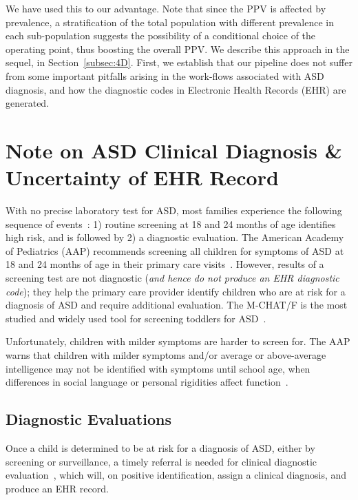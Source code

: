 \documentclass[onecolumn,,10pt]{IEEEtran}
\begin{document}
We have used this to our advantage. Note that since the PPV is affected by prevalence,  a stratification of the total population with different prevalence in each sub-population suggests the possibility of a conditional choice of the operating point, thus boosting the overall PPV. We describe this approach in the sequel, in Section~\ref{subsec:4D}. First, we establish that our pipeline does not suffer from some important pitfalls arising in the work-flows associated with ASD diagnosis, and how the diagnostic codes in Electronic Health Records (EHR) are generated.
%
\section{Note on ASD Clinical Diagnosis \& Uncertainty of EHR Record}\label{sec:diag}
With no precise laboratory  test for ASD, most families experience the following sequence of events~\cite{gordon2016whittling,penner2018practice,hyman2020identification}: 1) routine screening at 18 and 24 months of age  identifies high risk, and   is followed by 2) a diagnostic evaluation. The American Academy of Pediatrics (AAP)  recommends screening all
children for symptoms of ASD
 at 18 and
24 months of age in their primary
care visits~\cite{johnson2007identification,zwaigenbaum2015early}.  However, results of a screening test are not
diagnostic (\textit{and hence do not produce an EHR diagnostic code}); they help the primary care
provider identify children who are at
risk for a diagnosis of ASD and
require additional evaluation. The M-CHAT/F is the
most studied and widely used tool
for screening toddlers for ASD~\cite{robins2014validation,hyman2020identification}.

Unfortunately, children with milder symptoms are harder to screen for.
The AAP warns that children with milder symptoms
and/or average or above-average
intelligence  may not be identified
with symptoms until  school age,
when differences in social language
or personal rigidities affect function~\cite{hyman2020identification}.
%
\subsection{Diagnostic Evaluations}\label{subsec:diageval}

Once a child is determined to be at
risk for a diagnosis of ASD, either by
screening or surveillance, a timely
referral is needed for clinical diagnostic
evaluation~\cite{penner2018practice}, which 
will, on positive identification, assign a clinical diagnosis, and 
produce an EHR record.
\end{document}
